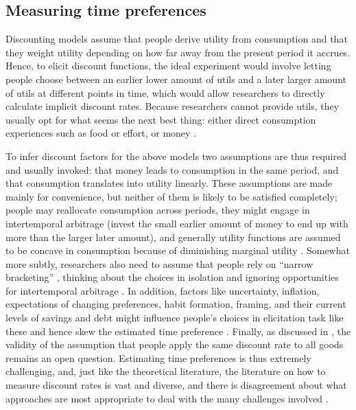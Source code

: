 \documentclass[a4paper, 11pt]{report}
\begin{document}
\subsection{Measuring time preferences}

Discounting models assume that people derive utility from consumption and that they weight utility depending on how far away from the present period it accrues. Hence, to elicit discount functions, the ideal experiment would involve letting people choose between an earlier lower amount of utils and a later larger amount of utils at different points in time, which would allow researchers to directly calculate implicit discount rates. Because researchers cannot provide utils, they usually opt for what seems the next best thing: either direct consumption experiences such as food or effort, or money \citet{frederick2002time,cohen2020measuring}.

To infer discount factors for the above models two assumptions are thus required and usually invoked: that money leads to consumption in the same period, and that consumption translates into utility linearly. These assumptions are made mainly for convenience, but neither of them is likely to be satisfied completely; people may reallocate consumption across periods, they might engage in intertemporal arbitrage (invest the small earlier amount of money to end up with more than the larger later amount), and generally utility functions are assumed to be concave in consumption because of diminishing marginal utility \citep{frederick2002time,cohen2020measuring}. Somewhat more subtly, researchers also need to assume that people rely on ``narrow bracketing'' \citep{read1999choice}, thinking about the choices in isolation and ignoring opportunities for intertemporal arbitrage \citep{frederick2002time,read2018intertemporal}. In addition, factors like uncertainty, inflation, expectations of changing preferences, habit formation, framing, and their current levels of savings and debt might influence people's choices in elicitation task like these and hence skew the estimated time preference \citep{frederick2002time}. Finally, as discussed in \citet{read2018intertemporal}, the validity of the assumption that people apply the same discount rate to all goods remains an open question. Estimating time preferences is thus extremely challenging, and, just like the theoretical literature, the literature on how to measure discount rates is vast and diverse, and there is disagreement about what approaches are most appropriate to deal with the many challenges involved \citep{cohen2020measuring}.
\end{document}
